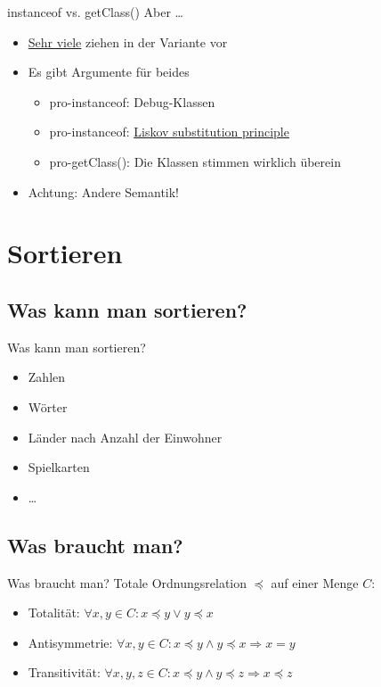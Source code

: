 \documentclass[usepdftitle=false,hyperref={pdfpagelabels=false}]{beamer}
\begin{document}
\begin{frame}{instanceof vs. getClass()}
    Aber \dots
    \begin{itemize}
        \item \href{http://stackoverflow.com/q/596462/562769}{Sehr viele} ziehen  in  der 
              Variante vor
        \item Es gibt Argumente für beides
        \begin{itemize}
            \item pro-instanceof: Debug-Klassen
            \item pro-instanceof: \href{http://en.wikipedia.org/wiki/Liskov_substitution_principle}{Liskov substitution principle}
            \item pro-getClass(): Die Klassen stimmen wirklich überein
        \end{itemize}
        \item Achtung: Andere Semantik!
    \end{itemize}
\end{frame}

\section{Sortieren}
\subsection{Was kann man sortieren?}
\begin{frame}{Was kann man sortieren?}
    \begin{itemize}
        \item Zahlen
        \item Wörter
        \item Länder nach Anzahl der Einwohner
        \item Spielkarten
        \item \dots
    \end{itemize}
\end{frame}

\subsection{Was braucht man?}
\begin{frame}{Was braucht man?}
    Totale Ordnungsrelation $\preceq$ auf einer Menge $C$:
    \begin{itemize}
        \item Totalität: $\forall x, y \in C: x \preceq y \lor y \preceq x$
        \item Antisymmetrie: $\forall x,y \in C: x \preceq y \land y \preceq x \Rightarrow x = y$
        \item Transitivität: $\forall x,y,z \in C: x \preceq y \land y \preceq z \Rightarrow x \preceq z$
    \end{itemize}
\end{frame}
\end{document}
